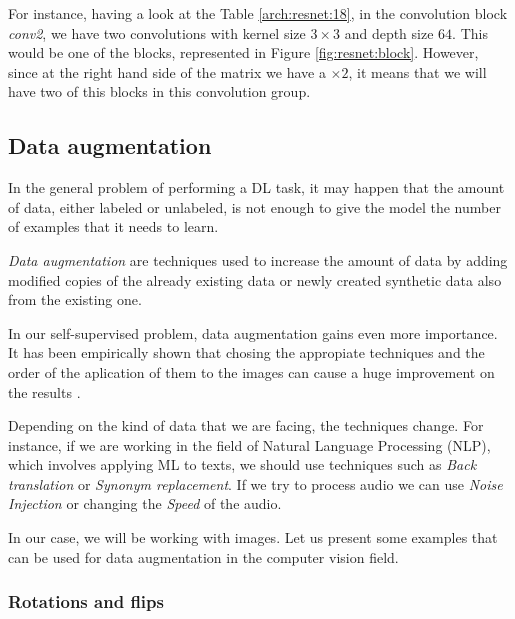 For instance, having a look at the Table \ref{arch:resnet:18}, in the convolution block \emph{conv2}, we have two convolutions with kernel size $3\times 3$ and depth size $64$. This would be one of the blocks, represented in Figure \ref{fig:resnet:block}. However, since at the right hand side of the matrix we have a $\times 2$, it means that we will have two of this blocks in this convolution group.

\subsection{Data augmentation}

In the general problem of performing a DL task, it may happen that the amount of data, either labeled or unlabeled, is not enough to give the model the number of examples that it needs to learn. 

\begin{ndef}
\emph{Data augmentation} are techniques used to increase the amount of data by adding modified copies of the already existing data or newly created synthetic data also from the existing one. 
\end{ndef}

In our self-supervised problem, data augmentation gains even more importance. It has been empirically shown that chosing the appropiate techniques and the order of the aplication of them to the images can cause a huge improvement on the results \citep{chen_simple_2020}.

Depending on the kind of data that we are facing, the techniques change. For instance, if we are working in the field of Natural Language Processing (NLP), which involves applying ML to texts, we should use techniques such as \emph{Back translation} or \emph{Synonym replacement}. If we try to process audio we can use \emph{Noise Injection} or changing the \emph{Speed} of the audio.

In our case, we will be working with images. Let us present some examples that can be used for data augmentation in the computer vision field.

\subsubsection*{Rotations and flips}

